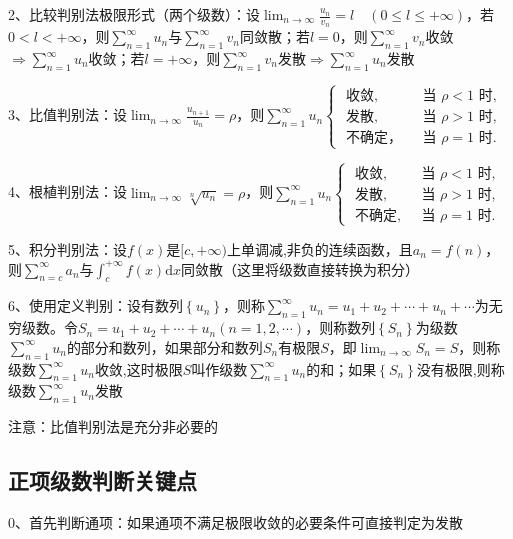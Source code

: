 2、比较判别法极限形式（两个级数）：设$\lim_{n \rightarrow \infty} \frac{u_{n}}{v_{n}}=l \quad(0 \leqslant l \leqslant+\infty)$，若$0<l<+\infty$，则$\sum_{n=1}^{\infty} u_{n}$与$\sum_{n=1}^{\infty} v_{n}$同敛散；若$l=0$，则$\sum_{n=1}^{\infty} v_{n}$收敛$\Rightarrow \sum_{n=1}^{\infty} u_{n}$收敛；若$l=+\infty$，则$\sum_{n=1}^{\infty} v_{n}$发散$\Rightarrow \sum_{n=1}^{\infty} u_{n}$发散

3、比值判别法：设$\lim_{n \rightarrow \infty} \frac{u_{n+1}}{u_{n}}=\rho$，则$\sum_{n=1}^{\infty} u_{n} \begin{cases}\text { 收敛, } & \text { 当 } \rho<1 \text { 时, } \\ \text { 发散, } & \text { 当 } \rho>1 \text { 时, } \\ \text { 不确定， } & \text { 当 } \rho=1 \text { 时. }\end{cases}$

4、根植判别法：设$\lim_{n \rightarrow \infty} \sqrt[n]{u_{n}}=\rho$，则$\sum_{n=1}^{\infty} u_{n} \begin{cases}\text { 收敛, } & \text { 当 } \rho<1 \text { 时, } \\ \text { 发散, } & \text { 当 } \rho>1 \text { 时, } \\ \text { 不确定, } & \text { 当 } \rho=1 \text { 时. }\end{cases}$

5、积分判别法：设$f(x)$是$[c,+\infty)$上单调减,非负的连续函数，且$a_{n}=f(n)$，则$\sum_{n=c}^{\infty} a_{n}$与$\int_{c}^{+\infty} f(x) \mathrm{d} x$同敛散（这里将级数直接转换为积分）

6、使用定义判别：设有数列$\left\{u_{n}\right\}$，则称$\sum_{n=1}^{\infty} u_{n}=u_{1}+u_{2}+\cdots+u_{n}+\cdots$为无穷级数。令$S_{n}=u_{1}+u_{2}+\cdots+u_{n}(n=1,2, \cdots)$，则称数列$\left\{S_{n}\right\}$为级数$\sum_{n=1}^{\infty} u_{n}$的部分和数列，如果部分和数列$ S_{n}$有极限$S$，即$\lim_{n \rightarrow \infty} S_{n}=S$，则称级数$\sum_{n=1}^{\infty} u_{n}$收敛,这时极限$S$叫作级数$\sum_{n=1}^{\infty} u_{n}$的和；如果$\left\{S_{n}\right\}$没有极限,则称级数$\sum_{n=1}^{\infty} u_{n}$发散

注意：比值判别法是充分非必要的



\subsection{正项级数判断关键点}

0、首先判断通项：如果通项不满足极限收敛的必要条件可直接判定为发散

